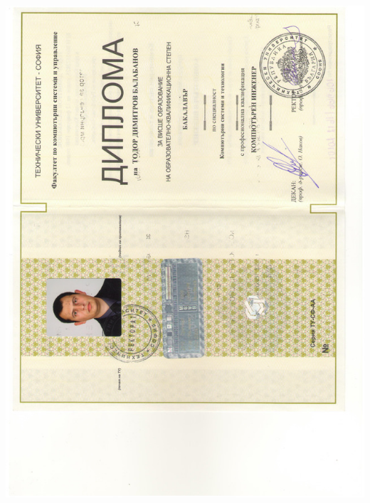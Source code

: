 \documentclass[english,a4paper]{europasscv}
\begin{document}
\includegraphics[width=\textwidth,height=\textheight,keepaspectratio]{DiplomaTU2010_2}
\end{document}
